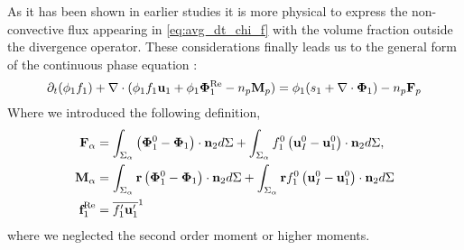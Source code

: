 As it has been shown in earlier studies \citep{jackson2000dynamics,chu2016flux} it is more physical to express the non-convective flux appearing in \ref{eq:avg_dt_chi_f} with the volume fraction outside the divergence operator. 
These considerations finally leads us to the general form of the continuous phase equation : 
\begin{equation}
    \partial_t (\phi_1 f_1)
    + \mathbf{\nabla}\cdot (\phi_1 f_1\textbf{u}_1
    + \phi_1 \bm{\Phi}^\text{Re}_1
    - n_p \textbf{M}_p )
    = 
    \phi_1(s_1  +\mathbf{\nabla}\cdot \mathbf{\Phi}_1)
    - n_p \textbf{F}_p
    \label{eq:hybrid_avg_dt_chif}
\end{equation}
Where we introduced the following definition, 
\begin{align*}
    \textbf{F}_\alpha 
    &= 
    \int_{\Sigma_\alpha}
    \left(
        \mathbf{\Phi}_1^0 
        - \mathbf{\Phi}_1
    \right)  
    \cdot \textbf{n}_2d\Sigma
    + 
    \int_{\Sigma_\alpha}f_1^0
    \left(
        \textbf{u}_I^0
        - \textbf{u}_1^0
    \right)
    \cdot \textbf{n}_2d\Sigma,\\
    \textbf{M}_\alpha 
    &= \int_{\Sigma_\alpha} \textbf{r}
        \left(\mathbf{\Phi}_1^0- \mathbf{\Phi}_1\right)\cdot \textbf{n}_2d\Sigma
        + \int_{\Sigma_\alpha} \textbf{r}f_1^0
        \left(
            \textbf{u}_I^0
            - \textbf{u}_1^0
        \right)
    \cdot \textbf{n}_2d\Sigma\\
    \textbf{f}^\text{Re}_1
    &= \overline{f_1' \textbf{u}_1'}^1 
\end{align*}
where we neglected the second order moment or higher moments. 


